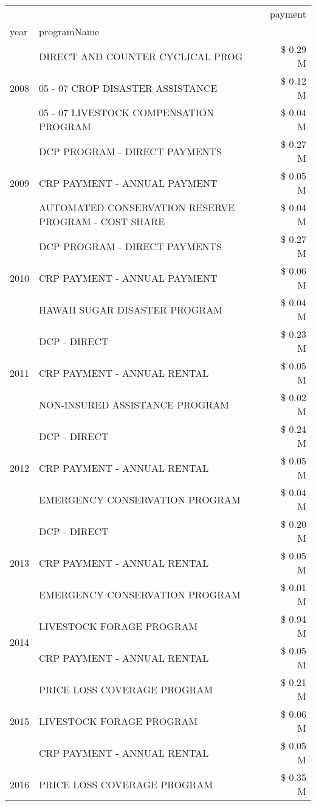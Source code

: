 \begin{tabular}{llr}
\toprule
 &  & payment \\
year & programName &  \\
\midrule
\multirow[t]{3}{*}{2008} & DIRECT AND COUNTER CYCLICAL PROG & \$ 0.29 M \\
 & 05 - 07 CROP DISASTER ASSISTANCE & \$ 0.12 M \\
 & 05 - 07 LIVESTOCK COMPENSATION PROGRAM & \$ 0.04 M \\
\cline{1-3}
\multirow[t]{3}{*}{2009} & DCP PROGRAM - DIRECT PAYMENTS & \$ 0.27 M \\
 & CRP PAYMENT - ANNUAL PAYMENT & \$ 0.05 M \\
 & AUTOMATED CONSERVATION RESERVE PROGRAM - COST SHARE & \$ 0.04 M \\
\cline{1-3}
\multirow[t]{3}{*}{2010} & DCP PROGRAM - DIRECT PAYMENTS & \$ 0.27 M \\
 & CRP PAYMENT - ANNUAL PAYMENT & \$ 0.06 M \\
 & HAWAII SUGAR DISASTER PROGRAM & \$ 0.04 M \\
\cline{1-3}
\multirow[t]{3}{*}{2011} & DCP - DIRECT & \$ 0.23 M \\
 & CRP PAYMENT - ANNUAL RENTAL & \$ 0.05 M \\
 & NON-INSURED ASSISTANCE PROGRAM & \$ 0.02 M \\
\cline{1-3}
\multirow[t]{3}{*}{2012} & DCP - DIRECT & \$ 0.24 M \\
 & CRP PAYMENT - ANNUAL RENTAL & \$ 0.05 M \\
 & EMERGENCY CONSERVATION PROGRAM & \$ 0.04 M \\
\cline{1-3}
\multirow[t]{3}{*}{2013} & DCP - DIRECT & \$ 0.20 M \\
 & CRP PAYMENT - ANNUAL RENTAL & \$ 0.05 M \\
 & EMERGENCY CONSERVATION PROGRAM & \$ 0.01 M \\
\cline{1-3}
\multirow[t]{2}{*}{2014} & LIVESTOCK FORAGE PROGRAM & \$ 0.94 M \\
 & CRP PAYMENT - ANNUAL RENTAL & \$ 0.05 M \\
\cline{1-3}
\multirow[t]{3}{*}{2015} & PRICE LOSS COVERAGE PROGRAM & \$ 0.21 M \\
 & LIVESTOCK FORAGE PROGRAM & \$ 0.06 M \\
 & CRP PAYMENT - ANNUAL RENTAL & \$ 0.05 M \\
\cline{1-3}
\multirow[t]{3}{*}{2016} & PRICE LOSS COVERAGE PROGRAM                   & \$ 0.35 M \\

\end{tabular}
